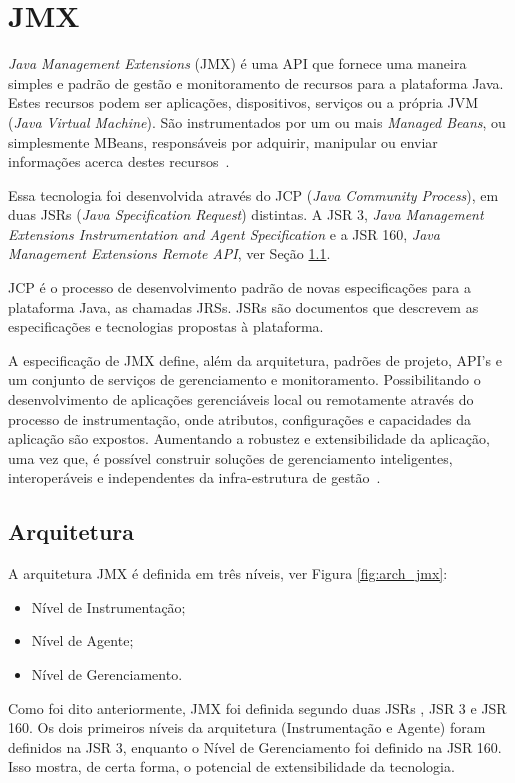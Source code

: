 \section{JMX}
\textit{Java Management Extensions} (JMX) é uma API que fornece uma maneira simples e padrão de gestão e monitoramento de recursos para a plataforma Java. Estes recursos podem ser aplicações, dispositivos, serviços ou a própria JVM (\textit{Java Virtual Machine}). São instrumentados por um ou mais \textit{Managed Beans}, ou simplesmente MBeans, responsáveis por adquirir, manipular ou enviar informações acerca destes recursos~\cite{lindfors2002jmx}.

Essa tecnologia foi desenvolvida através do JCP (\textit{Java Community Process}), em duas JSRs (\textit{Java Specification Request}) distintas. A JSR 3, \textit{Java Management Extensions Instrumentation and Agent Specification} e a JSR 160, \textit{Java Management Extensions Remote API}, ver Seção \ref{subsec:arch}.

JCP é o processo de desenvolvimento padrão de novas especificações para a plataforma Java, as chamadas JRSs. JSRs são documentos que descrevem as especificações e tecnologias propostas à plataforma.

A especificação de JMX define, além da arquitetura, padrões de projeto, API's e um conjunto de serviços de gerenciamento e monitoramento. Possibilitando o desenvolvimento de aplicações gerenciáveis local ou remotamente através do processo de instrumentação, onde atributos, configurações e capacidades da aplicação são expostos. Aumentando a robustez e extensibilidade da aplicação, uma vez que, é possível construir soluções de gerenciamento inteligentes, interoperáveis e independentes da infra-estrutura de gestão~\cite{jmx}.

\subsection{Arquitetura}
\label{subsec:arch}
A arquitetura JMX é definida em três níveis, ver Figura \ref{fig:arch_jmx}:

\begin{itemize}
 \item Nível de Instrumentação;
 \item Nível de Agente;
 \item Nível de Gerenciamento.
\end{itemize}

Como foi dito anteriormente, JMX foi definida segundo duas JSRs , JSR 3 e JSR 160. Os dois primeiros níveis da arquitetura (Instrumentação e Agente) foram definidos na JSR 3, enquanto o Nível de Gerenciamento foi definido na JSR 160. Isso mostra, de certa forma, o potencial de extensibilidade da tecnologia.

